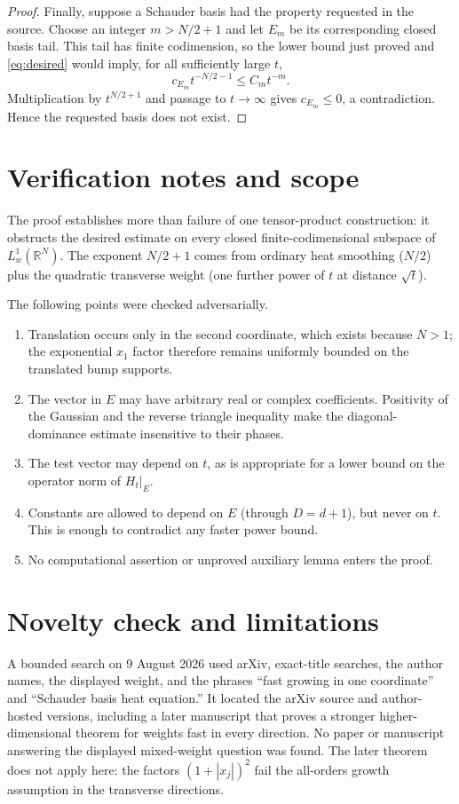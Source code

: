 \documentclass[11pt]{article}
\newcommand{\R}{\mathbb{R}}
\begin{document}
\begin{proof}
Finally, suppose a Schauder basis had the property requested in the source.
Choose an integer $m>N/2+1$ and let $E_m$ be its corresponding closed basis
tail.  This tail has finite codimension, so the lower bound just proved and
\eqref{eq:desired} would imply, for all sufficiently large $t$,
\[
 c_{E_m}t^{-N/2-1}\le C_mt^{-m}.
\]
Multiplication by $t^{N/2+1}$ and passage to $t\to\infty$ gives
$c_{E_m}\le0$, a contradiction.  Hence the requested basis does not exist.
\end{proof}

\section{Verification notes and scope}

The proof establishes more than failure of one tensor-product construction:
it obstructs the desired estimate on every closed finite-codimensional
subspace of $L^1_w(\R^N)$.  The exponent $N/2+1$ comes from ordinary heat
smoothing ($N/2$) plus the quadratic transverse weight (one further power of
$t$ at distance $\sqrt t$).

The following points were checked adversarially.
\begin{enumerate}
\item Translation occurs only in the second coordinate, which exists because
      $N>1$; the exponential $x_1$ factor therefore remains uniformly bounded
      on the translated bump supports.
\item The vector in $E$ may have arbitrary real or complex coefficients.
      Positivity of the Gaussian and the reverse triangle inequality make the
      diagonal-dominance estimate insensitive to their phases.
\item The test vector may depend on $t$, as is appropriate for a lower bound
      on the operator norm of $H_t|_E$.
\item Constants are allowed to depend on $E$ (through $D=d+1$), but never on
      $t$.  This is enough to contradict any faster power bound.
\item No computational assertion or unproved auxiliary lemma enters the
      proof.
\end{enumerate}

\section{Novelty check and limitations}

A bounded search on 9 August 2026 used arXiv, exact-title searches, the author
names, the displayed weight, and the phrases ``fast growing in one
coordinate'' and ``Schauder basis heat equation.''  It located the arXiv
source and author-hosted versions, including a later manuscript that proves a
stronger higher-dimensional theorem for weights fast in every direction.  No
paper or manuscript answering the displayed mixed-weight question was found.
The later theorem does not apply here: the factors $(1+|x_j|)^2$ fail the
all-orders growth assumption in the transverse directions.
\end{document}
